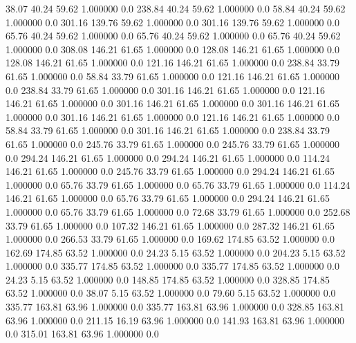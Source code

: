    38.07   40.24   59.62    1.000000    0.0
  238.84   40.24   59.62    1.000000    0.0
   58.84   40.24   59.62    1.000000    0.0
  301.16  139.76   59.62    1.000000    0.0
  301.16  139.76   59.62    1.000000    0.0
   65.76   40.24   59.62    1.000000    0.0
   65.76   40.24   59.62    1.000000    0.0
   65.76   40.24   59.62    1.000000    0.0
  308.08  146.21   61.65    1.000000    0.0
  128.08  146.21   61.65    1.000000    0.0
  128.08  146.21   61.65    1.000000    0.0
  121.16  146.21   61.65    1.000000    0.0
  238.84   33.79   61.65    1.000000    0.0
   58.84   33.79   61.65    1.000000    0.0
  121.16  146.21   61.65    1.000000    0.0
  238.84   33.79   61.65    1.000000    0.0
  301.16  146.21   61.65    1.000000    0.0
  121.16  146.21   61.65    1.000000    0.0
  301.16  146.21   61.65    1.000000    0.0
  301.16  146.21   61.65    1.000000    0.0
  301.16  146.21   61.65    1.000000    0.0
  121.16  146.21   61.65    1.000000    0.0
   58.84   33.79   61.65    1.000000    0.0
  301.16  146.21   61.65    1.000000    0.0
  238.84   33.79   61.65    1.000000    0.0
  245.76   33.79   61.65    1.000000    0.0
  245.76   33.79   61.65    1.000000    0.0
  294.24  146.21   61.65    1.000000    0.0
  294.24  146.21   61.65    1.000000    0.0
  114.24  146.21   61.65    1.000000    0.0
  245.76   33.79   61.65    1.000000    0.0
  294.24  146.21   61.65    1.000000    0.0
   65.76   33.79   61.65    1.000000    0.0
   65.76   33.79   61.65    1.000000    0.0
  114.24  146.21   61.65    1.000000    0.0
   65.76   33.79   61.65    1.000000    0.0
  294.24  146.21   61.65    1.000000    0.0
   65.76   33.79   61.65    1.000000    0.0
   72.68   33.79   61.65    1.000000    0.0
  252.68   33.79   61.65    1.000000    0.0
  107.32  146.21   61.65    1.000000    0.0
  287.32  146.21   61.65    1.000000    0.0
  266.53   33.79   61.65    1.000000    0.0
  169.62  174.85   63.52    1.000000    0.0
  162.69  174.85   63.52    1.000000    0.0
   24.23    5.15   63.52    1.000000    0.0
  204.23    5.15   63.52    1.000000    0.0
  335.77  174.85   63.52    1.000000    0.0
  335.77  174.85   63.52    1.000000    0.0
   24.23    5.15   63.52    1.000000    0.0
  148.85  174.85   63.52    1.000000    0.0
  328.85  174.85   63.52    1.000000    0.0
   38.07    5.15   63.52    1.000000    0.0
   79.60    5.15   63.52    1.000000    0.0
  335.77  163.81   63.96    1.000000    0.0
  335.77  163.81   63.96    1.000000    0.0
  328.85  163.81   63.96    1.000000    0.0
  211.15   16.19   63.96    1.000000    0.0
  141.93  163.81   63.96    1.000000    0.0
  315.01  163.81   63.96    1.000000    0.0
